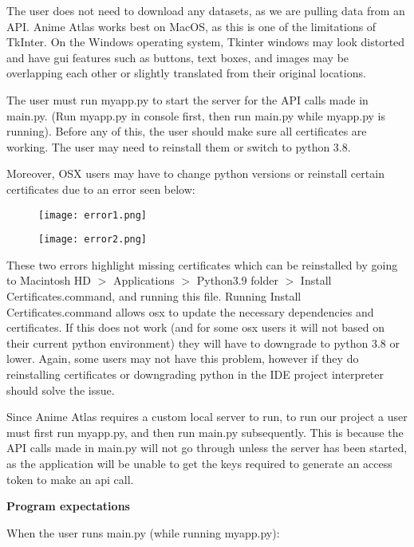 \documentclass[fontsize=11pt]{article}
\begin{document}
\item[]The user does not need to download any datasets, as we are pulling data from an API. Anime Atlas works best on MacOS, as this is one of the limitations of TkInter. On the Windows operating system, Tkinter windows may look distorted and have gui features such as buttons, text boxes, and images may be overlapping each other or slightly translated from their original locations. 

\item[] The user must run myapp.py to start the server for the API calls made in main.py. (Run myapp.py in console first, then run main.py while myapp.py is running). Before any of this, the user should make sure all certificates are working. The user may need to reinstall them or switch to python 3.8.

\newpage
\item[]Moreover, OSX users may have to change python versions or reinstall certain certificates due to an error seen below:

\begin{figure}[htp]
    \centering
    \texttt{[image: error1.png]}
\end{figure}
\begin{figure}[htp]
    \centering
    \texttt{[image: error2.png]}
\end{figure}

These two errors highlight missing certificates which can be reinstalled by going to Macintosh HD $>$ Applications $>$ Python3.9 folder $>$ Install Certificates.command, and running this file. Running Install Certificates.command allows osx to update the necessary dependencies and certificates. If this does not work (and for some osx users it will not based on their current python environment) they will have to downgrade to python 3.8 or lower. Again, some users may not have this problem, however if they do reinstalling certificates or downgrading python in the IDE project interpreter should solve the issue. \\

\item[]Since Anime Atlas requires a custom local server to run, to run our project a user must first run myapp.py, and then run main.py subsequently. This is because the API calls made in main.py will not go through unless the server has been started, as the application will be unable to get the keys required to generate an access token to make an api call. 

\newpage
\textbf{Program expectations}
\item[]When the user runs main.py (while running myapp.py):
\end{document}

